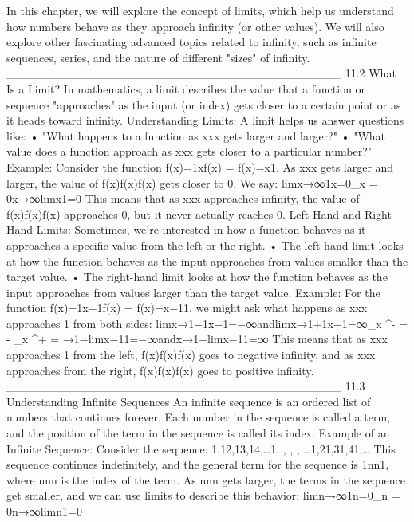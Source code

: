In this chapter, we will explore the concept of limits, which help us understand how numbers behave as they approach infinity (or other values). We will also explore other fascinating advanced topics related to infinity, such as infinite sequences, series, and the nature of different "sizes" of infinity.
________________________________________
11.2 What Is a Limit?
In mathematics, a limit describes the value that a function or sequence "approaches" as the input (or index) gets closer to a certain point or as it heads toward infinity.
Understanding Limits:
A limit helps us answer questions like:
•	"What happens to a function as xxx gets larger and larger?"
•	"What value does a function approach as xxx gets closer to a particular number?"
Example: Consider the function f(x)=1xf(x) = f(x)=x1. As xxx gets larger and larger, the value of f(x)f(x)f(x) gets closer to 0. We say:
lim⁡x→∞1x=0\lim_{x \to \infty}  = 0x→∞limx1=0
This means that as xxx approaches infinity, the value of f(x)f(x)f(x) approaches 0, but it never actually reaches 0.
Left-Hand and Right-Hand Limits:
Sometimes, we’re interested in how a function behaves as it approaches a specific value from the left or the right.
•	The left-hand limit looks at how the function behaves as the input approaches from values smaller than the target value.
•	The right-hand limit looks at how the function behaves as the input approaches from values larger than the target value.
Example: For the function f(x)=1x−1f(x) = f(x)=x−11, we might ask what happens as xxx approaches 1 from both sides:
lim⁡x→1−1x−1=−∞andlim⁡x→1+1x−1=∞\lim_{x ^-}  = -\infty \quad {} \quad \lim_{x ^+}  = \inftyx→1−limx−11=−∞andx→1+limx−11=∞
This means that as xxx approaches 1 from the left, f(x)f(x)f(x) goes to negative infinity, and as xxx approaches from the right, f(x)f(x)f(x) goes to positive infinity.
________________________________________
11.3 Understanding Infinite Sequences
An infinite sequence is an ordered list of numbers that continues forever. Each number in the sequence is called a term, and the position of the term in the sequence is called its index.
Example of an Infinite Sequence:
Consider the sequence:
1,12,13,14,…1, , , , \dots1,21,31,41,…
This sequence continues indefinitely, and the general term for the sequence is 1nn1, where nnn is the index of the term.
As nnn gets larger, the terms in the sequence get smaller, and we can use limits to describe this behavior:
lim⁡n→∞1n=0\lim_{n \to \infty}  = 0n→∞limn1=0
